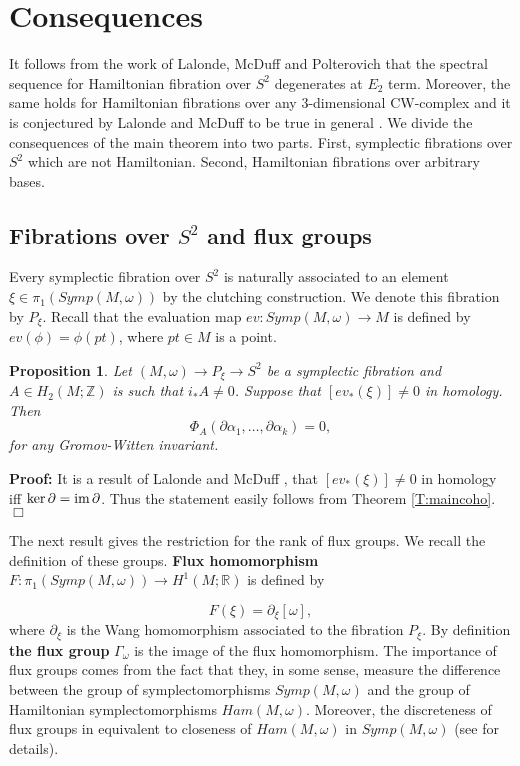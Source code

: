 \documentclass[a4paper,14pt]{article}
\newcommand{\B}[1]{\mathbb #1}
\newcommand{\al}{{\alpha}}
\newcommand{\om}{{\omega}}
\newcommand{\Ga}{{\Gamma}}
\newcommand{\Mo}{(M,\omega )}
\newcommand{\im}{\text {im \!}}
\newcommand{\pf}{\NI {\bf Proof: }}
\newcommand{\QED}{\hfill$\Box$\medskip}
\newcommand{\NI}{{\noindent}}
\newtheorem{prop}[theorem]{Proposition}
\numberwithin{equation}{section}
\begin{document}
\section{Consequences}\label{S:con}


It follows from the work of Lalonde, McDuff and Polterovich 
\cite{lmp1,m2} that the spectral sequence for Hamiltonian
fibration over $S^2$ degenerates at $E_2$ term. Moreover,
the same holds for Hamiltonian fibrations over any 3-dimensional
CW-complex  and it is conjectured by Lalonde and McDuff
to be  true in general \cite{lm}.
We divide the consequences of the main theorem into two parts.
First, symplectic fibrations over $S^2$ which are not
Hamiltonian. Second, Hamiltonian fibrations over arbitrary
bases.



\subsection{Fibrations over $S^2$ and flux groups}\label{SS:s2}

Every symplectic fibration over $S^2$ is naturally
associated to an element $\xi \in \pi _1(Symp\Mo )$
by the clutching construction. We denote this fibration
by $P_{\xi }$. Recall that the evaluation map
$ev:Symp\Mo \to M$ is defined by $ev(\phi )=\phi (pt)$,
where $pt\in M$ is a point.

\begin{prop}\label{P:evn0}
Let $\Mo \to P_{\xi } \to S^2$ be a symplectic fibration
and $A \in H_2(M;\B Z)$ is such that $i_*A\neq 0$.
Suppose that $[ev_*(\xi )]\neq 0$ in homology.
Then 
$$\Phi _A (\partial \al_1,\dots ,\partial \al_k)=0,$$
for any Gromov-Witten invariant.
\end{prop}





\pf 
It is a result of Lalonde and McDuff \cite{lm}, that
$[ev_*(\xi )]\neq 0$ in homology iff 
$\ker \partial = \im \partial$. Thus the statement easily
follows from Theorem \ref{T:maincoho}.
\QED

The next result gives the restriction for the rank of flux
groups. We recall the definition of these groups.
{\bf Flux homomorphism} $F:\pi _1(Symp\Mo )\to H^1(M;\B R)$
is defined by

$$F(\xi ) = \partial _{\xi }[\om ],$$
where $\partial _{\xi }$ is the Wang homomorphism
associated to the fibration $P_{\xi }$. By definition
{\bf the flux group } $\Ga _{\om }$ is the image
of the flux homomorphism. The importance of flux groups
comes from the fact that they, in some sense, measure
the difference between the group of symplectomorphisms
$Symp\Mo $
and the group of Hamiltonian symplectomorphisms
$Ham \Mo $. Moreover,
the discreteness of flux groups in equivalent to closeness
of $Ham \Mo $ in $Symp\Mo $ (see \cite{lmp1,ms1} for details).
\end{document}

